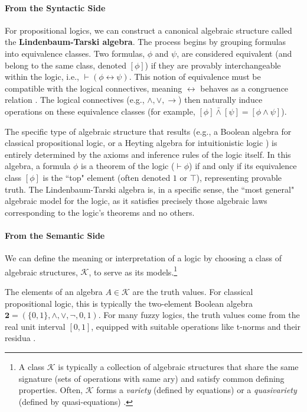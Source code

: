 \paragraph{From the Syntactic Side} For propositional logics, we can construct a canonical algebraic structure called the \textbf{Lindenbaum-Tarski algebra}. The process begins by grouping formulas into equivalence classes. Two formulas, $\phi$ and $\psi$, are considered equivalent (and belong to the same class, denoted $[\phi]$) if they are provably interchangeable within the logic, i.e., $\vdash (\phi \leftrightarrow \psi)$. This notion of equivalence must be compatible with the logical connectives, meaning $\leftrightarrow$ behaves as a congruence relation \cite[p.~1-2]{BlokPigozzi1989}. The logical connectives (e.g., $\wedge, \lor, \rightarrow$) then naturally induce operations on these equivalence classes (for example, $[\phi] \bar{\wedge} [\psi] = [\phi \wedge \psi]$).

The specific type of algebraic structure that results (e.g., a Boolean algebra for classical propositional logic, or a Heyting algebra for intuitionistic logic \cite[Ch.~1]{ResiduatedLattices2007}) is entirely determined by the axioms and inference rules of the logic itself. In this algebra, a formula $\phi$ is a theorem of the logic ($\vdash \phi$) if and only if its equivalence class $[\phi]$ is the ``top" element (often denoted $1$ or $\top$), representing provable truth. The Lindenbaum-Tarski algebra is, in a specific sense, the ``most general" algebraic model for the logic, as it satisfies precisely those algebraic laws corresponding to the logic's theorems and no others.

\paragraph{From the Semantic Side} We can define the meaning or interpretation of a logic by choosing a class of algebraic structures, $\mathcal{K}$, to serve as its models.\footnote{A class $\mathcal{K}$ is typically a collection of algebraic structures that share the same signature (sets of operations with same ary) and satisfy common defining properties. Often, $\mathcal{K}$ forms a \textit{variety} (defined by equations) or a \textit{quasivariety} (defined by quasi-equations) \cite[Def.~2.2]{BlokPigozzi1989}.}

The elements of an algebra $A \in \mathcal{K}$ are the truth values. For classical propositional logic, this is typically the two-element Boolean algebra $\mathbf{2} = (\{0,1\}, \land, \lor, \neg, 0, 1)$. For many fuzzy logics, the truth values come from the real unit interval $[0,1]$, equipped with suitable operations like t-norms and their residua \cite[Ch.~2]{Hajek1998}.

